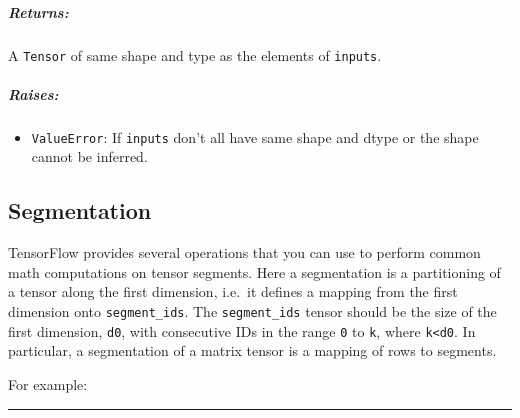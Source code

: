 \subparagraph{Returns: }\label{returns-45}

A \texttt{Tensor} of same shape and type as the elements of
\texttt{inputs}.

\subparagraph{Raises: }\label{raises}

\begin{itemize}
\tightlist
\item
  \texttt{ValueError}: If \texttt{inputs} don't all have same shape and
  dtype or the shape cannot be inferred.
\end{itemize}

\subsection{Segmentation }\label{segmentation}

TensorFlow provides several operations that you can use to perform
common math computations on tensor segments. Here a segmentation is a
partitioning of a tensor along the first dimension, i.e.~it defines a
mapping from the first dimension onto \texttt{segment\_ids}. The
\texttt{segment\_ids} tensor should be the size of the first dimension,
\texttt{d0}, with consecutive IDs in the range \texttt{0} to \texttt{k},
where \texttt{k\textless{}d0}. In particular, a segmentation of a matrix
tensor is a mapping of rows to segments.

For example:

\begin{Shaded}
\begin{Highlighting}[]
\OperatorTok{=} \NormalTok{tf.constant([[}\NormalTok{,}\NormalTok{,}\NormalTok{,}\NormalTok{], [}\OperatorTok{-}\NormalTok{,}\OperatorTok{-}\NormalTok{,}\OperatorTok{-}\NormalTok{,}\OperatorTok{-}\NormalTok{], [}\NormalTok{,}\NormalTok{,}\NormalTok{,}\NormalTok{]])}
\NormalTok{tf.segment_sum(c, tf.constant([}\NormalTok{, }\NormalTok{, }\NormalTok{]))}
  \OperatorTok{==>}  \NormalTok{[[}   \NormalTok{]}
        \NormalTok{[}   \NormalTok{]]}
\end{Highlighting}
\end{Shaded}

\begin{center}\rule{0.5\linewidth}{\linethickness}\end{center}

